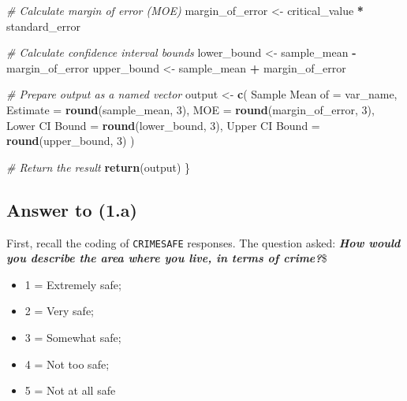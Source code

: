 \documentclass[
  11pt,
]{article}
\newenvironment{Shaded}{\begin{snugshade}}{\end{snugshade}}
\newcommand{\AttributeTok}[1]{\textcolor[rgb]{0.13,0.29,0.53}{#1}}
\newcommand{\CommentTok}[1]{\textcolor[rgb]{0.56,0.35,0.01}{\textit{#1}}}
\newcommand{\DecValTok}[1]{\textcolor[rgb]{0.00,0.00,0.81}{#1}}
\newcommand{\FunctionTok}[1]{\textcolor[rgb]{0.13,0.29,0.53}{\textbf{#1}}}
\newcommand{\NormalTok}[1]{#1}
\newcommand{\OtherTok}[1]{\textcolor[rgb]{0.56,0.35,0.01}{#1}}
\newcommand{\SpecialCharTok}[1]{\textcolor[rgb]{0.81,0.36,0.00}{\textbf{#1}}}
\newcommand{\StringTok}[1]{\textcolor[rgb]{0.31,0.60,0.02}{#1}}
\providecommand{\tightlist}{%
  \setlength{\itemsep}{0pt}\setlength{\parskip}{0pt}}
\begin{document}
\begin{Shaded}
\begin{Highlighting}[]
  \CommentTok{\# Calculate margin of error (MOE)}
\NormalTok{  margin\_of\_error }\OtherTok{\textless{}{-}}\NormalTok{ critical\_value }\SpecialCharTok{*}\NormalTok{ standard\_error}

  \CommentTok{\# Calculate confidence interval bounds}
\NormalTok{  lower\_bound }\OtherTok{\textless{}{-}}\NormalTok{ sample\_mean }\SpecialCharTok{{-}}\NormalTok{ margin\_of\_error}
\NormalTok{  upper\_bound }\OtherTok{\textless{}{-}}\NormalTok{ sample\_mean }\SpecialCharTok{+}\NormalTok{ margin\_of\_error}

  \CommentTok{\# Prepare output as a named vector}
\NormalTok{  output }\OtherTok{\textless{}{-}} \FunctionTok{c}\NormalTok{(}
    \StringTok{\textasciigrave{}}\AttributeTok{Sample Mean of}\StringTok{\textasciigrave{}} \OtherTok{=}\NormalTok{ var\_name,}
    \AttributeTok{Estimate =} \FunctionTok{round}\NormalTok{(sample\_mean, }\DecValTok{3}\NormalTok{),}
    \AttributeTok{MOE =} \FunctionTok{round}\NormalTok{(margin\_of\_error, }\DecValTok{3}\NormalTok{),}
    \StringTok{\textasciigrave{}}\AttributeTok{Lower CI Bound}\StringTok{\textasciigrave{}} \OtherTok{=} \FunctionTok{round}\NormalTok{(lower\_bound, }\DecValTok{3}\NormalTok{),}
    \StringTok{\textasciigrave{}}\AttributeTok{Upper CI Bound}\StringTok{\textasciigrave{}} \OtherTok{=} \FunctionTok{round}\NormalTok{(upper\_bound, }\DecValTok{3}\NormalTok{)}
\NormalTok{  )}

  \CommentTok{\# Return the result}
  \FunctionTok{return}\NormalTok{(output)}
\NormalTok{\}}
\end{Highlighting}
\end{Shaded}

\subsection{Answer to (1.a)}\label{answer-to-1.a}

First, recall the coding of \texttt{CRIMESAFE} responses. The question
asked: \textbf{\emph{How would you describe the area where you live, in
terms of crime?}}\$

\begin{itemize}
\tightlist
\item
  1 = Extremely safe;
\item
  2 = Very safe;
\item
  3 = Somewhat safe;
\item
  4 = Not too safe;
\item
  5 = Not at all safe
\end{itemize}
\end{document}

